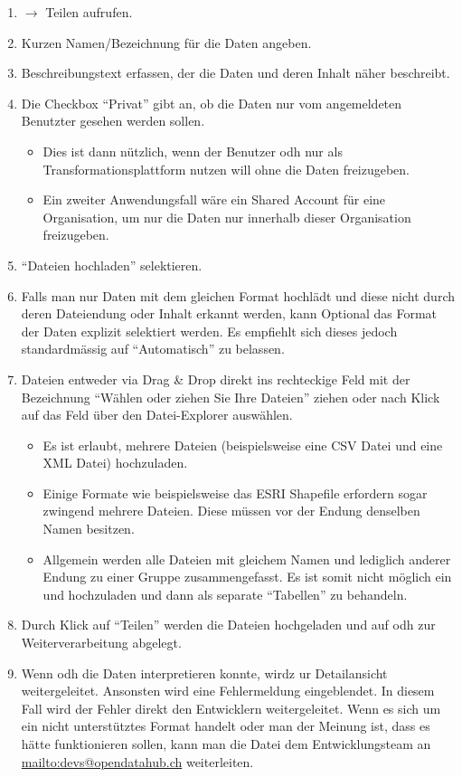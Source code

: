 \begin{enumerate}
\item {} $\to$ Teilen aufrufen.
\item Kurzen Namen/Bezeichnung für die Daten angeben.
\item Beschreibungstext erfassen, der die Daten und deren Inhalt näher beschreibt.
\item Die Checkbox ``Privat'' gibt an, ob die Daten nur vom angemeldeten Benutzter gesehen werden sollen.
	\begin{itemize}
	\item Dies ist dann nützlich, wenn der Benutzer \acl{odh} nur als Transformationsplattform nutzen will ohne die Daten freizugeben.
	\item Ein zweiter Anwendungsfall wäre ein Shared Account für eine Organisation, um nur die Daten nur innerhalb dieser Organisation freizugeben.
	\end{itemize}
\item ``Dateien hochladen'' selektieren.
\item Falls man nur Daten mit dem gleichen Format hochlädt und diese nicht durch deren Dateiendung oder Inhalt erkannt werden, kann Optional das Format der Daten explizit selektiert werden. Es empfiehlt sich dieses jedoch standardmässig auf ``Automatisch'' zu belassen.
\item Dateien entweder via Drag \& Drop direkt ins rechteckige Feld mit der Bezeichnung ``Wählen oder ziehen Sie Ihre Dateien'' ziehen oder nach Klick auf das Feld über den Datei-Explorer auswählen.
	\begin{itemize}
	\item Es ist erlaubt, mehrere Dateien (beispielsweise eine CSV Datei und eine XML Datei) hochzuladen.
	\item Einige Formate wie beispielsweise das ESRI Shapefile erfordern sogar zwingend mehrere Dateien. Diese müssen vor der Endung denselben Namen besitzen.
	\item Allgemein werden alle Dateien mit gleichem Namen und lediglich anderer Endung zu einer Gruppe zusammengefasst. Es ist somit nicht möglich ein  und  hochzuladen und dann als separate ``Tabellen'' zu behandeln.
	\end{itemize}
\item Durch Klick auf ``Teilen'' werden die Dateien hochgeladen und auf \acl{odh} zur Weiterverarbeitung abgelegt.
\item Wenn \acl{odh} die Daten interpretieren konnte, wirdz ur Detailansicht weitergeleitet. Ansonsten wird eine Fehlermeldung eingeblendet. In diesem Fall wird der Fehler direkt den Entwicklern weitergeleitet. Wenn es sich um ein nicht unterstütztes Format handelt oder man der Meinung ist, dass es hätte funktionieren sollen, kann man die Datei dem Entwicklungsteam an \url{mailto:devs@opendatahub.ch} weiterleiten.
\end{enumerate}

